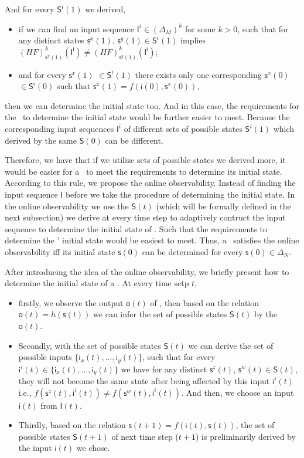 And for every $\mathsf{S}^{i}(1)$ we derived, 
\begin{itemize}
  \item if we can find an input sequence $\mathsf{I}^{i}\in(\Delta_M)^k$ for some $k>0$, such that for any distinct states $\mathsf{s}^{x}(1)$, $\mathsf{s}^{y}(1) \in \mathsf{S}^{i}(1)$ implies $(HF)^k_{\mathsf{s}^{x}(1)}(\mathsf{I^i})\neq (HF)^k_{\mathsf{s}^{y}(1)}(\mathsf{I^i})$;
  \item  and for every $\mathsf{s}^{x}(1)$ $\in \mathsf{S}^{i}(1)$ there exists only one corresponding $\mathsf{s}^{x}(0)$ $\in \mathsf{S}^{i}(0)$ such that $\mathsf{s}^{x}(1)=f({\mathsf{i}(0)},{\mathsf{s}^{x}(0)})$,
\end{itemize} 
then we can determine the initial state too. And in this case, the requirements for the \BCN\ to determine the initial state would be further easier to meet. Because the corresponding input sequences $\mathsf{I}^{i}$ of different sets of possible states $\mathsf{S}^{i}(1)$ which derived by the same $\mathsf{S}(0)$ can be different. 

Therefore, we have that if we utilize sets of possible states we derived more, it would be easier for a \BCN\ to meet the requirements to determine its initial state. According to this rule, we propose the online observability. Instead of finding the input sequence $\mathsf{I}$ before we take the procedure of determining the initial state. In the online observability we use the $\mathsf{S}(t)$ (which will be formally defined in the next subsection) we derive at every time step to adaptively contruct the input sequence to determine the initial state of \BCNs. Such that the requirements to determine the \BCNs' initial state would be easiest to meet. Thus, a \BCN\ satisfies the online observability iff its initial state $\mathsf{s}(0)$ can be determined for every $\mathsf{s}(0) \in \Delta_N$.

After introducing the idea of the online observability, we briefly present how to determine the initial state of a \BCN. At every time setp $t$, 
\begin{itemize}
\item firstly, we observe the output $\mathsf{o}(t)$ of \BCN, then based on the relation $\mathsf{o}(t)=h(\mathsf{s}(t))$ we can infer the set of possible states $\mathsf{S}(t)$ by the $\mathsf{o}(t)$.
\item Secondly, with the set of possible states $\mathsf{S}(t)$ we can derive the set of possible inputs $\{\mathsf{i}_x(t),\ldots,\mathsf{i}_y(t)\}$, such that for every $\mathsf{i}^{i}(t)\in \{\mathsf{i}_x(t),\ldots,\mathsf{i}_y(t)\}$ we have  for any distinct $\mathsf{s}^{z}(t)$, $\mathsf{s}^{w}(t) \in \mathsf{S}(t)$, they will not become the same state after being affected by this input $\mathsf{i}^{i}(t)$ i.e., $f(\mathsf{s}^{z}(t), \mathsf{i}^{i}(t))\neq f(\mathsf{s}^{w}(t),\mathsf{i}^{i}(t))$.  And then, we choose an input $\mathsf{i}(t)$ from $\mathsf{I}(t)$.
\item Thirdly, based on the relation $\mathsf{s}(t+1)= f({\mathsf{i}(t)},{\mathsf{s}(t)})$, the set of possible states $\mathsf{S}(t+1)$ of next time step ($t+1$) is preliminarily derived by the input $\mathsf{i}(t)$ we chose. 
\end{itemize} 

